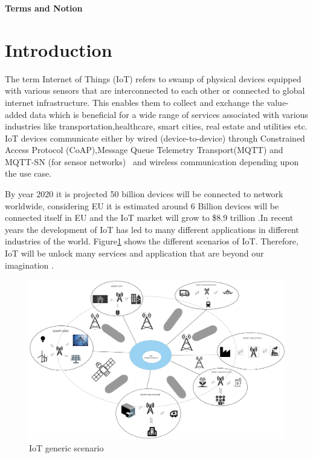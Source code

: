 \documentclass[12pt]{article}
\newcommand{\TODO}{\todo[inline]}
\begin{document}


\newpage
\tableofcontents
\hypersetup{hidelinks}
\newpage

\Large{\textbf{Terms and Notion}}
\newpage

\listoffigures
\newpage

\listoftables




\newpage
\section{Introduction}
\TODO{re-write the whole Intro}
The term Internet of Things (IoT) refers to swamp of physical devices equipped with various sensors that are interconnected to each other or connected to global internet infrastructure. This enables them to collect and  exchange the value-added data which is beneficial for a wide range of services associated with various industries like transportation,healthcare, smart cities, real estate and utilities etc. IoT devices communicate either by wired (device-to-device) through Constrained Access Protocol (CoAP),Message Queue Telemetry Transport(MQTT) and MQTT-SN (for sensor networks)~\cite{singh2015secure} and wireless communication depending upon the use case.\par
By year 2020 it is projected 50 billion devices will be connected to network worldwide, considering EU it is estimated around 6 Billion devices will be connected itself in EU \cite{EUIoT} and the IoT market will grow to \$8.9 trillion \cite{liu2019privacy}.In recent years the development of IoT has led to many different applications in different industries of the world. Figure\ref{fig:IoT generic scenario} shows the different scenarios of IoT. Therefore, IoT will be unlock many services and application that are beyond our imagination \cite{IoTfuture}. 
\begin{figure}[H]
  \includegraphics[width=\columnwidth,height=7cm,keepaspectratio]{Images/iot_generic_scenario.pdf}
  \centering
  \caption{IoT generic scenario}
  \label{fig:IoT generic scenario}
\end{figure}
\end{document}
